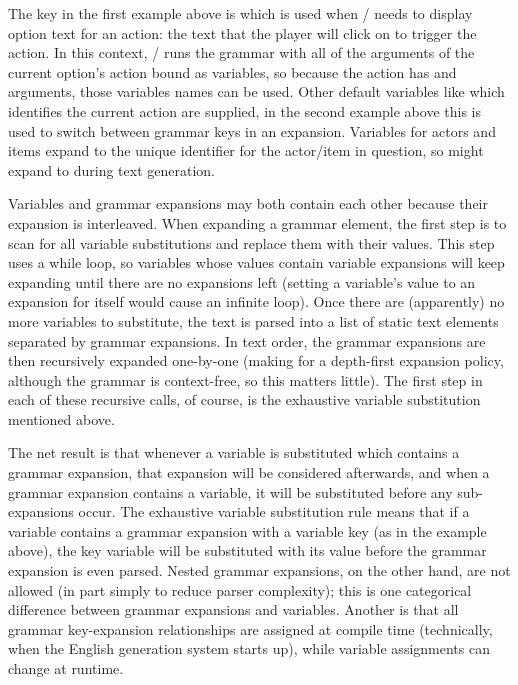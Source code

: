 The key in the first example above is  which is used when \dunyazad/ needs to display option text for an  action: the text that the player will click on to trigger the action.
%
In this context, \dunyazad/ runs the grammar with all of the arguments of the current option's action bound as variables, so because the  action has  and  arguments, those variables names can be used.
%
Other default variables like  which identifies the current action are supplied, in the second example above this is used to switch between grammar keys in an expansion.
%
Variables for actors and items expand to the unique identifier for the actor/item in question, so  might expand to  during text generation.


Variables and grammar expansions may both contain each other because their expansion is interleaved.
%
When expanding a grammar element, the first step is to scan for all variable substitutions and replace them with their values.
%
This step uses a while loop, so variables whose values contain variable expansions will keep expanding until there are no expansions left (setting a variable's value to an expansion for itself would cause an infinite loop).
%
Once there are (apparently) no more variables to substitute, the text is parsed into a list of static text elements separated by grammar expansions.
%
In text order, the grammar expansions are then recursively expanded one-by-one (making for a depth-first expansion policy, although the grammar is context-free, so this matters little).
%
The first step in each of these recursive calls, of course, is the exhaustive variable substitution mentioned above.


The net result is that whenever a variable is substituted which contains a grammar expansion, that expansion will be considered afterwards, and when a grammar expansion contains a variable, it will be substituted before any sub-expansions occur.
%
The exhaustive variable substitution rule means that if a variable contains a grammar expansion with a variable key (as in the example above), the key variable will be substituted with its value before the grammar expansion is even parsed.
%
Nested grammar expansions, on the other hand, are not allowed (in part simply to reduce parser complexity); this is one categorical difference between grammar expansions and variables.
%
Another is that all grammar key-expansion relationships are assigned at compile time (technically, when the English generation system starts up), while variable assignments can change at runtime.



